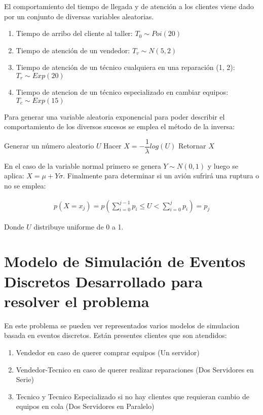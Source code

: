 \documentclass[a4paper,10pt,twocolumn]{article}
\begin{document}
		El comportamiento del tiempo de llegada y de atención a los clientes viene dado por un conjunto de diversas variables aleatorias.
		
		\begin{enumerate}
			\item Tiempo de arribo del cliente al taller: $T_{0} \sim  Poi(20)$
			\item Tiempo de atención de un vendedor: $T_{v} \sim N(5,2)$
			\item Tiempo de atención de un técnico cualquiera en una reparación (1, 2): $T_{r} \sim Exp(20)$
			\item Tiempo de atencion de un técnico especializado en cambiar equipos: $T_{c} \sim Exp(15)$
		\end{enumerate}

		Para generar una variable aleatoria exponencial para poder describir el comportamiento de los diversos sucesos se emplea el m\'etodo de la inversa:
		
		\begin{algorithmic}[1]
			\STATE Generar un n\'umero aleatorio $U$
			\STATE Hacer $X = - \dfrac{1}{\lambda} log(U)$ 
			\STATE Retornar $X$
		\end{algorithmic}

		En el caso de la variable normal primero se genera $Y \sim N(0,1)$ y luego se aplica: $X = \mu + Y\sigma$. Finalmente para determinar si un avi\'on sufrir\'a una ruptura o no se emplea:
		
		\begin{align*}
			p\left(X = x_{j}\right) = p\left(\sum_{i=0}^{j-1} p_{i} \leq U < \sum_{i=0}^{j}p_{i} \right) = p_{j}
		\end{align*}

		Donde $U$ distribuye uniforme de 0 a 1. 



\section{Modelo de Simulación de Eventos Discretos Desarrollado para resolver el problema} \label{sub:listings}
En este problema se pueden ver representados varios modelos de simulacion basada en eventos discretos. Están presentes clientes que son atendidos:
\begin{enumerate}[label=\roman*)]
	\item Vendedor en caso de querer comprar equipos (Un servidor)
	\item Vendedor-Tecnico en caso de querer realizar reparaciones (Dos Servidores en Serie)
	\item Tecnico y Tecnico Especializado si no hay clientes que requieran cambio de equipos en cola (Dos Servidores en Paralelo)
\end{enumerate}
\end{document}
